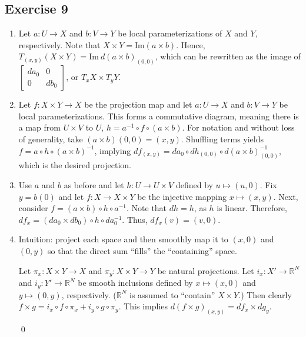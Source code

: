 \documentclass{article}
\newcommand{\R}{\mathbb{R}}
\begin{document}
\subsection*{Exercise 9}
  \begin{enumerate}[label=(\arabic*)]
    \item{
      Let $a\colon U\to X$ and $b\colon V\to Y$ be local parameterizations of
      $X$ and $Y$, respectively. Note that $X\times Y=\text{Im}(a\times b)$.
      Hence, $T_{(x,y)}(X\times Y)=\text{Im}\ d(a\times b)_{(0,0)}$, which can
      be rewritten as the image of
      $\left[
        \begin{smallmatrix}
          da_0  & 0   \\
          0     & db_0
        \end{smallmatrix}
      \right]$, or $T_xX\times T_yY$.
    }
    \item{
      Let $f\colon X\times Y\to X$ be the projection map and let $a\colon U\to
      X$ and $b\colon V\to Y$ be local parameterizations. This forms a
      commutative diagram, meaning there is a map from $U\times V$ to $U$,
      $h=a^{-1}\circ f\circ(a\times b)$. For notation and without loss of
      generality, take $(a\times b)(0,0)=(x,y)$. Shuffling terms yields $f=a
      \circ h \circ(a\times b)^{-1}$, implying $df_{(x,y)}=da_0\circ dh_{(0,0)}
      \circ d(a\times b)^{-1}_{(0,0)}$, which is the desired projection.
    }
    \item{
      Use $a$ and $b$ as before and let $h\colon U\to U\times V$ defined by $u
      \mapsto(u,0)$. Fix $y=b(0)$ and let $f\colon X\to X\times Y$ be the
      injective mapping $x\mapsto(x,y)$. Next, consider $f=(a\times b)\circ h
      \circ a^{-1}$. Note that $dh=h$, as $h$ is linear. Therefore, $df_x=
      (da_0\times db_0)\circ h\circ da^{-1}_0$. Thus, $df_x(v)=(v,0)$.
    }
    \item{
      Intuition: project each space and then smoothly map it to $(x,0)$ and
      $(0,y)$ so that the direct sum ``fills'' the ``containing'' space.

      Let $\pi_x\colon X\times Y\to X$ and $\pi_y\colon X\times Y\to Y$ be
      natural projections. Let $i_x\colon X'\to\R^N$ and $i_y\colon Y'\to\R^N$
      be smooth inclusions defined by $x\mapsto(x,0)$ and $y\mapsto(0,y)$,
      respectively. ($\R^N$ is assumed to ``contain'' $X\times Y$.) Then clearly
      $f\times g=i_x\circ f\circ\pi_x+i_y\circ g\circ\pi_y$. This implies
      $d(f\times g)_{(x,y)}=df_x\times dg_y$.
    }
    \qed
  \end{enumerate}
\end{document}
